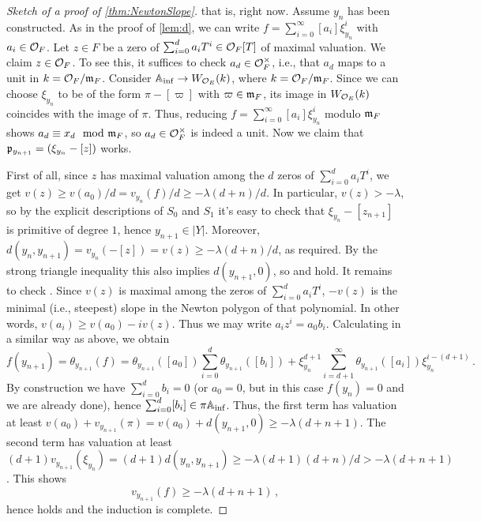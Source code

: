 \begin{proof}[Sketch of a proof of \cref{thm:NewtonSlope}]
	\dotso that is, right now. Assume $y_n$ has been constructed. As in the proof of \cref{lem:d}, we can write $f=\sum_{i=0}^\infty [a_i]\xi_{y_n}^i$ with $a_i\in\mathcal{O}_F$. Let $z\in F$ be a zero of $\sum_{i=0}^da_iT^i\in\mathcal{O}_F[T]$ of maximal valuation. We claim $z\in\mathcal{O}_F$. To see this, it suffices to check $a_d\in\mathcal{O}_F^\times$, i.e., that $a_d$ maps to a unit in $k=\mathcal{O}_F/\mathfrak{m}_F$. Consider $\IA_\inf\morphism W_{\Oo_E}(k)$, where $k=\mathcal{O}_F/\mathfrak{m}_F$. Since we can choose $\xi_{y_n}$ to be of the form $\pi-[\varpi]$ with $\varpi\in \mathfrak{m}_F$, its image in $W_{\mathcal{O}_E}(k)$ coincides with the image of $\pi$. Thus, reducing $f=\sum_{i=0}^\infty [a_i]\xi_{y_n}^i$ modulo $\mathfrak{m}_F$ shows $a_d\equiv x_d\mod {\mathfrak{m}}_F$, so $a_d\in\mathcal{O}_F^\times$ is indeed a unit. Now we claim that $\mathfrak{p}_{y_{n+1}}=(\xi_{y_n}-[z])$ works.
	
	First of all, since $z$ has maximal valuation among the $d$ zeros of $\sum_{i=0}^da_iT^i$, we get $v(z)\geq v(a_0)/d=v_{y_n}(f)/d\geq -\lambda(d+n)/d$. In particular, $v(z)>-\lambda$, so by the explicit descriptions of $S_0$ and $S_1$ it's easy to check that $\xi_{y_n}-[z_{n+1}]$ is primitive of degree $1$, hence $y_{n+1}\in|Y|$. Moreover, $d(y_n,y_{n+1})=v_{y_n}(-[z])=v(z)\geq -\lambda(d+n)/d$, as required. By the strong triangle inequality this also implies $d(y_{n+1},0)$, so  and  hold. It remains to check . Since $v(z)$ is maximal among the zeros of $\sum_{i=0}^da_iT^i$, $-v(z)$ is the minimal (i.e., steepest) slope in the Newton polygon of that polynomial. In other words, $v(a_i)\geq v(a_0)-iv(z)$. Thus we may write $a_iz^i=a_0b_i$. Calculating in a similar way as above, we obtain
	\begin{equation*}
		f(y_{n+1})=\theta_{y_{n+1}}(f)=\theta_{y_{n+1}}([a_0])\sum_{i=0}^d\theta_{y_{n+1}}([b_i])+\xi_{y_n}^{d+1}\sum_{i=d+1}^\infty \theta_{y_{n+1}}([a_i])\xi_{y_n}^{i-(d+1)}\,.
	\end{equation*}
	By construction we have $\sum_{i=0}^db_i=0$ (or $a_0=0$, but in this case $f(y_n)=0$ and we are already done), hence $\sum_{i=0}^d[b_i]\in\pi\mathbb{A}_{\mathrm{inf}}$. Thus, the first term has valuation at least $v(a_0)+v_{y_{n+1}}(\pi)=v(a_0)+d(y_{n+1},0)\geq -\lambda (d+n+1)$. The second term has valuation at least $(d+1)v_{y_{n+1}}(\xi_{y_n})=(d+1)d(y_n,y_{n+1})\geq -\lambda(d+1)(d+n)/d>-\lambda(d+n+1)$. This shows
	\begin{equation*}
		v_{y_{n+1}}(f)\geq -\lambda(d+n+1)\,,
	\end{equation*}
	hence  holds and the induction is complete.
\end{proof}

